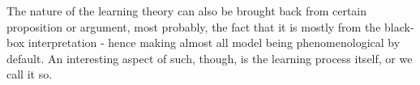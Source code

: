 The nature of the learning theory can also be brought back from certain proposition or argument, most probably, the fact that it is mostly from the black-box interpretation - hence making almost all model being phenomenological by default. An interesting aspect of such, though, is the learning process itself, or we call it so. 
%
%
%    

